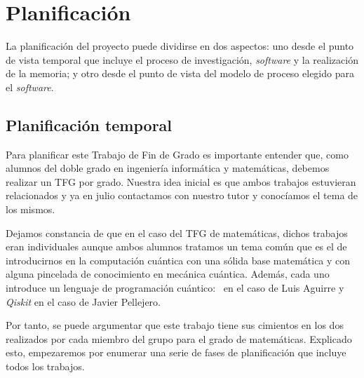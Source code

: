 \section{Planificación}

La planificación del proyecto puede dividirse en dos aspectos: uno desde el punto de vista temporal que incluye el proceso de investigación, \textit{software} y la realización de la memoria; y otro desde el punto de vista del modelo de proceso elegido para el \textit{software}.

\subsection{Planificación temporal}

Para planificar este Trabajo de Fin de Grado es importante entender que, como alumnos del doble grado en ingeniería informática y matemáticas, debemos realizar un TFG por grado. Nuestra idea inicial es que ambos trabajos estuvieran relacionados y ya en julio contactamos con nuestro tutor y conocíamos el tema de los mismos.

Dejamos constancia de que en el caso del TFG de matemáticas, dichos trabajos eran individuales aunque ambos alumnos tratamos un tema común que es el de introducirnos en la computación cuántica con una sólida base matemática y con alguna pincelada de conocimiento en mecánica cuántica. Además, cada uno introduce un lenguaje de programación cuántico: \qsh\ en el caso de Luis Aguirre y \textit{Qiskit} en el caso de Javier Pellejero.

Por tanto, se puede argumentar que este trabajo tiene sus cimientos en los dos realizados por cada miembro del grupo para el grado de matemáticas. Explicado esto, empezaremos por enumerar una serie de fases de planificación que incluye todos los trabajos.

